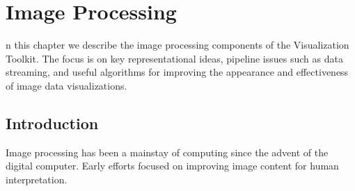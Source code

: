 \chapter{Image Processing}
\label{chap:image_processing}

n this chapter we describe the image processing components of the Visualization Toolkit.
The focus is on key representational ideas, pipeline issues such as data streaming, and useful algorithms for improving the appearance and effectiveness of image data visualizations.

\section{Introduction}
Image processing has been a mainstay of computing since the advent of the digital computer. Early efforts focused on improving image content for human interpretation.
